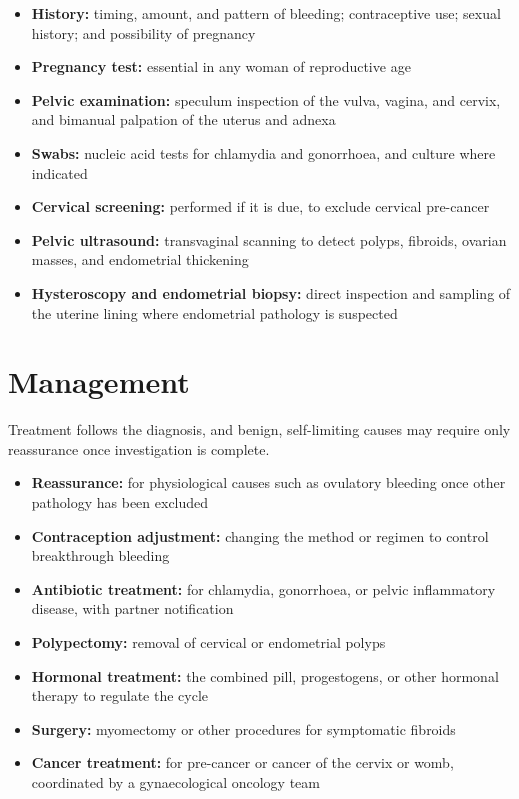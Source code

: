 \begin{itemize}
    \item \textbf{History:} timing, amount, and pattern of bleeding; contraceptive use; sexual history; and possibility of pregnancy
    \item \textbf{Pregnancy test:} essential in any woman of reproductive age
    \item \textbf{Pelvic examination:} speculum inspection of the vulva, vagina, and cervix, and bimanual palpation of the uterus and adnexa
    \item \textbf{Swabs:} nucleic acid tests for chlamydia and gonorrhoea, and culture where indicated
    \item \textbf{Cervical screening:} performed if it is due, to exclude cervical pre-cancer
    \item \textbf{Pelvic ultrasound:} transvaginal scanning to detect polyps, fibroids, ovarian masses, and endometrial thickening
    \item \textbf{Hysteroscopy and endometrial biopsy:} direct inspection and sampling of the uterine lining where endometrial pathology is suspected
\end{itemize}

\section*{Management}
Treatment follows the diagnosis, and benign, self-limiting causes may require only reassurance once investigation is complete.

\begin{itemize}
    \item \textbf{Reassurance:} for physiological causes such as ovulatory bleeding once other pathology has been excluded
    \item \textbf{Contraception adjustment:} changing the method or regimen to control breakthrough bleeding
    \item \textbf{Antibiotic treatment:} for chlamydia, gonorrhoea, or pelvic inflammatory disease, with partner notification
    \item \textbf{Polypectomy:} removal of cervical or endometrial polyps
    \item \textbf{Hormonal treatment:} the combined pill, progestogens, or other hormonal therapy to regulate the cycle
    \item \textbf{Surgery:} myomectomy or other procedures for symptomatic fibroids
    \item \textbf{Cancer treatment:} for pre-cancer or cancer of the cervix or womb, coordinated by a gynaecological oncology team
\end{itemize}

